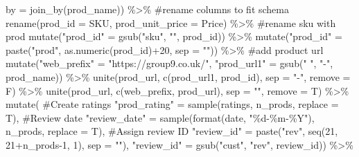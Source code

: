 \documentclass[
  letterpaper,
  DIV=11,
  numbers=noendperiod]{scrartcl}
\newenvironment{Shaded}{\begin{snugshade}}{\end{snugshade}}
\newcommand{\AttributeTok}[1]{\textcolor[rgb]{0.40,0.45,0.13}{#1}}
\newcommand{\CommentTok}[1]{\textcolor[rgb]{0.37,0.37,0.37}{#1}}
\newcommand{\DecValTok}[1]{\textcolor[rgb]{0.68,0.00,0.00}{#1}}
\newcommand{\FunctionTok}[1]{\textcolor[rgb]{0.28,0.35,0.67}{#1}}
\newcommand{\NormalTok}[1]{\textcolor[rgb]{0.00,0.23,0.31}{#1}}
\newcommand{\OtherTok}[1]{\textcolor[rgb]{0.00,0.23,0.31}{#1}}
\newcommand{\SpecialCharTok}[1]{\textcolor[rgb]{0.37,0.37,0.37}{#1}}
\newcommand{\StringTok}[1]{\textcolor[rgb]{0.13,0.47,0.30}{#1}}
\begin{document}
\begin{Shaded}
\begin{Highlighting}[numbers=left,,]
            \AttributeTok{by =} \FunctionTok{join\_by}\NormalTok{(prod\_name)) }\SpecialCharTok{\%\textgreater{}\%}
  \CommentTok{\#rename columns to fit schema}
  \FunctionTok{rename}\NormalTok{(}\AttributeTok{prod\_id =}\NormalTok{ SKU, }\AttributeTok{prod\_unit\_price =}\NormalTok{ Price) }\SpecialCharTok{\%\textgreater{}\%}
  \CommentTok{\#rename \textasciigrave{}sku\textasciigrave{} with \textasciigrave{}prod\textasciigrave{}}
  \FunctionTok{mutate}\NormalTok{(}\StringTok{"prod\_id"} \OtherTok{=} \FunctionTok{gsub}\NormalTok{(}\StringTok{"sku"}\NormalTok{, }\StringTok{""}\NormalTok{, prod\_id)) }\SpecialCharTok{\%\textgreater{}\%}
  \FunctionTok{mutate}\NormalTok{(}\StringTok{"prod\_id"} \OtherTok{=} \FunctionTok{paste}\NormalTok{(}\StringTok{"prod"}\NormalTok{, }\FunctionTok{as.numeric}\NormalTok{(prod\_id)}\SpecialCharTok{+}\DecValTok{20}\NormalTok{, }\AttributeTok{sep =} \StringTok{""}\NormalTok{)) }\SpecialCharTok{\%\textgreater{}\%}
  \CommentTok{\#add product url}
  \FunctionTok{mutate}\NormalTok{(}\StringTok{"web\_prefix"} \OtherTok{=} \StringTok{"https://group9.co.uk/"}\NormalTok{,}
         \StringTok{"prod\_url1"} \OtherTok{=} \FunctionTok{gsub}\NormalTok{(}\StringTok{" "}\NormalTok{, }\StringTok{"{-}"}\NormalTok{, prod\_name)) }\SpecialCharTok{\%\textgreater{}\%}
  \FunctionTok{unite}\NormalTok{(prod\_url, }\FunctionTok{c}\NormalTok{(prod\_url1, prod\_id), }\AttributeTok{sep =} \StringTok{"{-}"}\NormalTok{, }\AttributeTok{remove =}\NormalTok{ F) }\SpecialCharTok{\%\textgreater{}\%}
  \FunctionTok{unite}\NormalTok{(prod\_url, }\FunctionTok{c}\NormalTok{(web\_prefix, prod\_url), }\AttributeTok{sep =} \StringTok{""}\NormalTok{, }\AttributeTok{remove =}\NormalTok{ T) }\SpecialCharTok{\%\textgreater{}\%}
  \FunctionTok{mutate}\NormalTok{(}
    \CommentTok{\#Create ratings}
    \StringTok{"prod\_rating"} \OtherTok{=} \FunctionTok{sample}\NormalTok{(ratings, n\_prods, }\AttributeTok{replace =}\NormalTok{ T),}
    \CommentTok{\#Review date}
    \StringTok{"review\_date"} \OtherTok{=} \FunctionTok{sample}\NormalTok{(}\FunctionTok{format}\NormalTok{(date, }\StringTok{"\%d{-}\%m{-}\%Y"}\NormalTok{), n\_prods, }\AttributeTok{replace =}\NormalTok{ T),}
    \CommentTok{\#Assign review ID}
    \StringTok{"review\_id"} \OtherTok{=} \FunctionTok{paste}\NormalTok{(}\StringTok{"rev"}\NormalTok{, }\FunctionTok{seq}\NormalTok{(}\DecValTok{21}\NormalTok{, }\DecValTok{21}\SpecialCharTok{+}\NormalTok{n\_prods}\DecValTok{{-}1}\NormalTok{, }\DecValTok{1}\NormalTok{), }\AttributeTok{sep =} \StringTok{""}\NormalTok{),}
    \StringTok{"review\_id"} \OtherTok{=} \FunctionTok{gsub}\NormalTok{(}\StringTok{"cust"}\NormalTok{, }\StringTok{"rev"}\NormalTok{, review\_id)) }\SpecialCharTok{\%\textgreater{}\%}

\end{Highlighting}
\end{Shaded}
\end{document}
